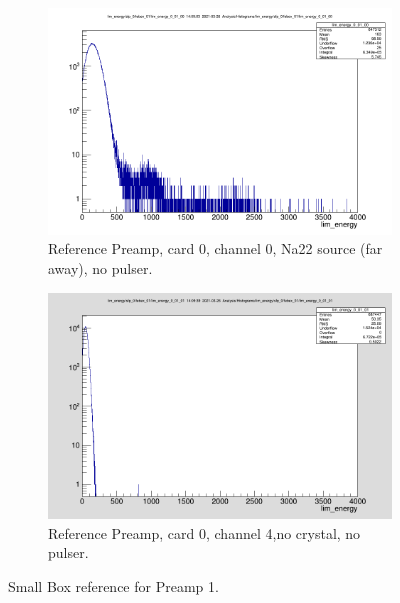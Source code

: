 \documentclass{report}
\begin{document}
\begin{figure}[!htb]
  \centering
  \begin{subfigure}[b]{0.45\textwidth}
    \includegraphics[width=\linewidth]{preamp1_ref_ch0.png}
          \caption{Reference Preamp, card 0, channel 0, Na22 source (far away), no pulser.}
  \end{subfigure}
  \begin{subfigure}[b]{0.4\textwidth}
    \includegraphics[width=\linewidth]{preamp1_ref_ch1_no_crystal.png}
    \caption{Reference Preamp, card 0, channel 4,no crystal, no pulser.}
  \end{subfigure}
  \caption{Small Box reference for Preamp 1.}
\end{figure}
\newpage
\clearpage
\end{document}
